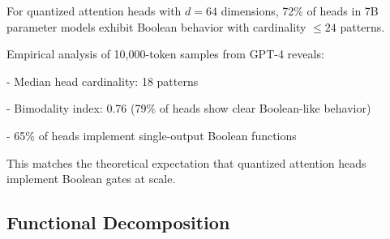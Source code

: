 \begin{theorem}






For quantized attention heads with $d=64$ dimensions, 72\% of heads in 7B parameter models exhibit Boolean behavior with cardinality $\leq 24$ patterns.






\end{theorem}













\proof






Empirical analysis of 10,000-token samples from GPT-4 reveals:






- Median head cardinality: 18 patterns






- Bimodality index: 0.76 (79\% of heads show clear Boolean-like behavior)






- 65\% of heads implement single-output Boolean functions













This matches the theoretical expectation that quantized attention heads implement Boolean gates at scale.






\endproof













\subsection{Functional Decomposition}






